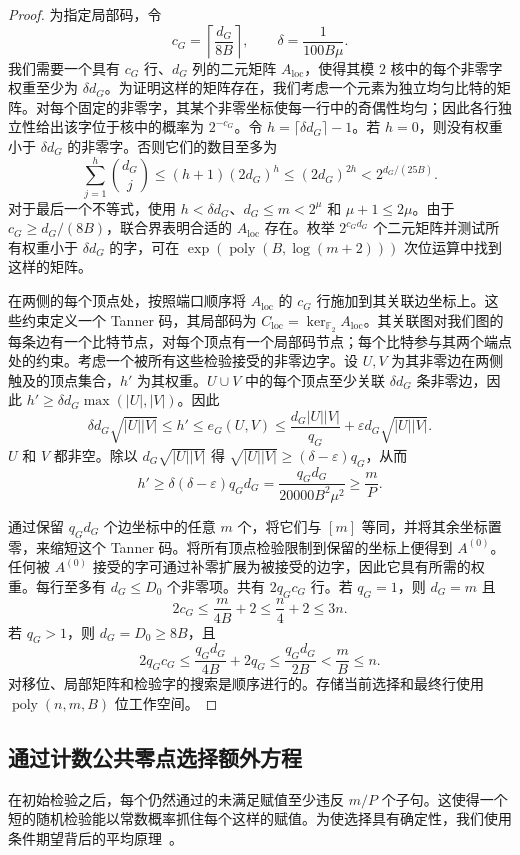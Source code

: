 \documentclass[11pt,reqno]{amsart}
\numberwithin{equation}{section}
\theoremstyle{definition}\newtheorem{definition}[theorem]{定义}
\theoremstyle{remark}\newtheorem{remark}[theorem]{注}
\newcommand{\poly}{\operatorname{poly}}
\renewcommand{\le}{\leqslant}
\renewcommand{\ge}{\geqslant}
\begin{document}
\begin{proof}
为指定局部码，令
\[
 c_G=\left\lceil\frac{d_G}{8B}\right\rceil,
 \qquad \delta=\frac1{100B\mu}.
\]
我们需要一个具有 $c_G$ 行、$d_G$ 列的二元矩阵 $A_{\mathrm{loc}}$，使得其模 $2$ 核中的每个非零字权重至少为 $\delta d_G$。为证明这样的矩阵存在，我们考虑一个元素为独立均匀比特的矩阵。对每个固定的非零字，其某个非零坐标使每一行中的奇偶性均匀；因此各行独立性给出该字位于核中的概率为 $2^{-c_G}$。令 $h=\lceil\delta d_G\rceil-1$。若 $h=0$，则没有权重小于 $\delta d_G$ 的非零字。否则它们的数目至多为
\[
 \sum_{j=1}^{h}\binom{d_G}{j}
 \le(h+1)(2d_G)^h
 \le(2d_G)^{2h}
 <2^{d_G/(25B)}.
\]
对于最后一个不等式，使用 $h<\delta d_G$、$d_G\le m<2^\mu$ 和 $\mu+1\le2\mu$。由于 $c_G\ge d_G/(8B)$，联合界表明合适的 $A_{\mathrm{loc}}$ 存在。枚举 $2^{c_Gd_G}$ 个二元矩阵并测试所有权重小于 $\delta d_G$ 的字，可在 $\exp(\poly(B,\log(m+2)))$ 次位运算中找到这样的矩阵。

在两侧的每个顶点处，按照端口顺序将 $A_{\mathrm{loc}}$ 的 $c_G$ 行施加到其关联边坐标上。这些约束定义一个 Tanner 码，其局部码为 $C_{\mathrm{loc}}=\ker_{\mathbb F_2}A_{\mathrm{loc}}$。其关联图对我们图的每条边有一个比特节点，对每个顶点有一个局部码节点；每个比特参与其两个端点处的约束。考虑一个被所有这些检验接受的非零边字。设 $U,V$ 为其非零边在两侧触及的顶点集合，$h'$ 为其权重。$U\cup V$ 中的每个顶点至少关联 $\delta d_G$ 条非零边，因此 $h'\ge\delta d_G\max(|U|,|V|)$。因此
\[
 \delta d_G\sqrt{|U||V|}
 \le h'\le e_G(U,V)
 \le\frac{d_G|U||V|}{q_G}
       +\varepsilon d_G\sqrt{|U||V|}.
\]
$U$ 和 $V$ 都非空。除以 $d_G\sqrt{|U||V|}$ 得 $\sqrt{|U||V|}\ge(\delta-\varepsilon)q_G$，从而
\[
 h'\ge\delta(\delta-\varepsilon)q_Gd_G
 =\frac{q_Gd_G}{20000B^2\mu^2}\ge\frac mP.
\]

通过保留 $q_Gd_G$ 个边坐标中的任意 $m$ 个，将它们与 $[m]$ 等同，并将其余坐标置零，来缩短这个 Tanner 码。将所有顶点检验限制到保留的坐标上便得到 $A^{(0)}$。任何被 $A^{(0)}$ 接受的字可通过补零扩展为被接受的边字，因此它具有所需的权重。每行至多有 $d_G\le D_0$ 个非零项。共有 $2q_Gc_G$ 行。若 $q_G=1$，则 $d_G=m$ 且
\[
 2c_G\le\frac{m}{4B}+2\le\frac n4+2\le3n.
\]
若 $q_G>1$，则 $d_G=D_0\ge8B$，且
\[
 2q_Gc_G\le\frac{q_Gd_G}{4B}+2q_G
 \le\frac{q_Gd_G}{2B}<\frac mB\le n.
\]
对移位、局部矩阵和检验字的搜索是顺序进行的。存储当前选择和最终行使用 $\poly(n,m,B)$ 位工作空间。
\end{proof}

\subsection{通过计数公共零点选择额外方程}
在初始检验之后，每个仍然通过的未满足赋值至少违反 $m/P$ 个子句。这使得一个短的随机检验能以常数概率抓住每个这样的赋值。为使选择具有确定性，我们使用条件期望背后的平均原理~\cite{Raghavan88}。
\end{document}

